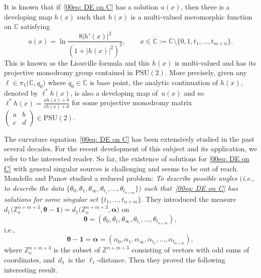 \documentclass[pdftex]{sigma}
\numberwithin{equation}{section}
\def\C{\mathbb C}
\def\Z{\mathbb Z}
\def\PSU{\mathrm{PSU}}
\def\SM#1#2#3#4{\left(\begin{smallmatrix}#1&#2\\#3&#4\end{smallmatrix}
 \right)}
\begin{document}
It is known that if~\eqref{00eq: DE on C} has a solution $u(x)$, then
there is a developing map $h(x)$ such that $h(x)$ is a multi-valued meromorphic
function on $\C$ satisfying
\begin{equation*}%
 u(x)=\ln\frac{8|h'(x)|^2}{(1+|h(x)|^2)^2},\qquad x\in
 \dot{\C}:=\mathbb{C}\setminus\{0,1,t_1,\dots,t_{m+n}\}.
\end{equation*}
This is known as the Liouville formula and this $h(x)$ is multi-valued
and has its projective monodromy group contained in $\PSU(2)$. More
precisely, given any $\ell\in \pi_1\bigl(\dot{\C}, q_0\bigr)$ where
$q_0\in\dot{\C}$ is base point, the analytic continuation of $h(x)$,
denoted by $\ell^*h(x)$, is also a developing map of~$u(x)$ and so
$\ell^*h(x)=\frac{ah(x)+b}{ch(x)+d}$ for some projective monodromy
matrix $\SM{a}{b}{c}{d}\in\PSU(2)$.

The curvature equation~\eqref{00eq: DE on C} has been extensively
studied in the past several decades. For the recent development of
this subject and its application, we refer
\cite{Chai-Lin-Wang,Chen-Lin-weight2,
 Chen-Lin-rectangular,Chen-Lin-Green-function,Chen-Lin-Yang,
Eremenko,Coaxial,EGT,Quadrilateral,Guo-Lin-Yang,
 Lin-Wang-bubbling,Luo-Tian,Mondello-Panov,Mondello-Panov2}
to the interested reader. So far, the existence of solutions for
\eqref{00eq: DE on C} with general singular sources is challenging
and seems to be out of reach.
Mondello and Panov \cite{Mondello-Panov} studied a reduced
problem: \emph{To describe possible angles $($i.e., to describe the data
 $\{\theta_0,
 \theta_1,\theta_\infty,\theta_{t_1},\dots,\theta_{t_{n+m}}\})$ such
 that~\eqref{00eq: DE on C} has solutions for some singular set
 $\{t_1,\dots,t_{n+m}\}$}.
They introduced the measure
$d_1\bigl(\Z_o^{n+m+3},{\boldsymbol\theta-\boldsymbol
 1}\bigr)=d_1\bigl(\Z_o^{n+m+3},{\boldsymbol\alpha}\bigr)$ on
\[
 \boldsymbol \theta=(\theta_0,\theta_1,\theta_\infty,\theta_{t_1},
 \dots,\theta_{t_{n+m}}),
\]
i.e.,
\[
 \boldsymbol\theta-\boldsymbol 1={\boldsymbol\alpha}
 =(\alpha_0,\alpha_1,\alpha_\infty,\alpha_{t_1},\dots,
 \alpha_{t_{n+m}}),
\]
where $\Z_o^{n+m+3}$ is the subset of $\Z^{n+m+3}$ consisting of
vectors with odd sums of coordinates, and~$d_1$~is the
$\ell_1$-distance. Then they proved the following interesting result.
\end{document}
